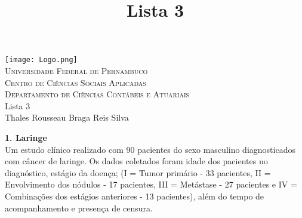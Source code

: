 \documentclass[12pt,a4paper]{article}
\title{Lista 3}
\date{}
\begin{document}
	\begin{center}
		\texttt{[image: Logo.png]}\\
		\textsc{Universidade Federal de Pernambuco\\
			Centro de Ciências Sociais Aplicadas\\
			Departamento de Ciências Contábeis e Atuariais\\}
		\vspace{5cm}
		\huge Lista 3\\ \normalsize
		\vspace{4cm}
		Thales Rousseau Braga Reis Silva
	\end{center}
	\newpage
	\textbf{1. Laringe}
	\vspace{0.5cm}\\
	Um estudo clínico realizado com 90 pacientes  do sexo masculino diagnosticados com câncer de laringe. Os dados coletados foram idade dos pacientes no diagnóstico, estágio da doença; (I = Tumor primário - 33 pacientes, II = Envolvimento dos nódulos - 17 pacientes, III = Metástase - 27 pacientes e IV = Combinações dos estágios anteriores - 13 pacientes), além do tempo de acompanhamento e presença de censura.
	\vspace{0.5cm}
\end{document}
